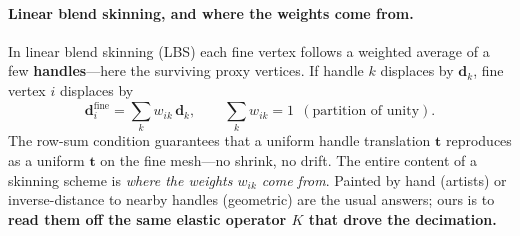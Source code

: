 \paragraph{Linear blend skinning, and where the weights come from.}
In linear blend skinning (LBS) each fine vertex follows a weighted average of a few \textbf{handles}---here the surviving proxy vertices.
If handle $k$ displaces by $\mathbf d_k$, fine vertex $i$ displaces by
\begin{equation}
  \mathbf d_i^{\text{fine}} = \sum_k w_{ik}\,\mathbf d_k,
  \qquad \sum_k w_{ik}=1\ \ (\text{partition of unity}).
\end{equation}
The row-sum condition guarantees that a uniform handle translation $\mathbf t$ reproduces as a uniform $\mathbf t$ on the fine mesh---no shrink, no drift.
The entire content of a skinning scheme is \emph{where the weights $w_{ik}$ come from}.
Painted by hand (artists) or inverse-distance to nearby handles (geometric) are the usual answers; ours is to \textbf{read them off the same elastic operator $K$ that drove the decimation.}

